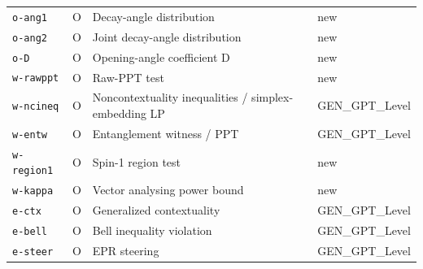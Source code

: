 \begin{ruledtabular}
\begin{tabular}{llll}
\texttt{o-ang1} & O & Decay-angle distribution & new \\
\texttt{o-ang2} & O & Joint decay-angle distribution & new \\
\texttt{o-D} & O & Opening-angle coefficient D & new \\
\texttt{w-rawppt} & O & Raw-PPT test & new \\
\texttt{w-ncineq} & O & Noncontextuality inequalities / simplex-embedding LP & GEN\_GPT\_Level \\
\texttt{w-entw} & O & Entanglement witness / PPT & GEN\_GPT\_Level \\
\texttt{w-region1} & O & Spin-1 region test & new \\
\texttt{w-kappa} & O & Vector analysing power bound & new \\
\texttt{e-ctx} & O & Generalized contextuality & GEN\_GPT\_Level \\
\texttt{e-bell} & O & Bell inequality violation & GEN\_GPT\_Level \\
\texttt{e-steer} & O & EPR steering & GEN\_GPT\_Level \\
\end{tabular}
\end{ruledtabular}
